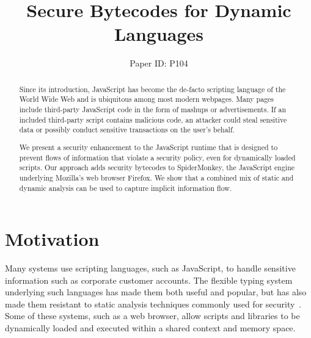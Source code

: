 \documentclass{llncs}
\begin{document}
\pagestyle{empty}

\mainmatter

\title{Secure Bytecodes for Dynamic Languages}


\author{Paper ID: P104}



\maketitle

\begin{abstract}

Since its introduction, JavaScript has become the de-facto scripting language of the World Wide Web and is ubiquitous among most modern webpages.
Many pages include third-party JavaScript code in the form of mashups or advertisements.
If an included third-party script contains malicious code, an attacker could steal sensitive data or possibly conduct sensitive transactions on the user's behalf.

We present a security enhancement to the JavaScript runtime that is designed to prevent flows of information that violate a security policy, even for dynamically loaded scripts.
Our approach adds security bytecodes to SpiderMonkey, the JavaScript engine underlying Mozilla's web browser Firefox.
We show that a combined mix of static and dynamic analysis can be used to capture implicit information flow.

\end{abstract}


\section{Motivation}

Many systems use scripting languages, such as JavaScript, to handle sensitive information such as corporate customer accounts.
The flexible typing system underlying such languages has made them both useful and popular, but has also made them resistant to static analysis techniques commonly used for security~\cite{363526}.
Some of these systems, such as a web browser, allow scripts and libraries to be dynamically loaded and executed within a shared context and memory space.
\end{document}
